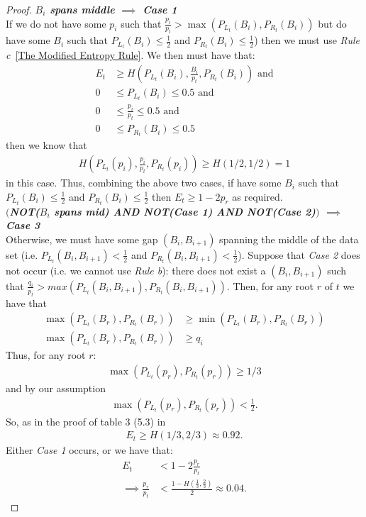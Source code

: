 \documentclass[letterpaper,12pt,titlepage,oneside,final]{book}
\theoremstyle{plain}
\begin{document}
\begin{proof}
\noindent\textbf{\textit{$B_i$ spans middle $\implies$ Case 1}} \\
If we do not have some $p_i$ such that $\frac{p_i}{p_t} > \max(P_{L_t}(B_i), P_{R_t}(B_i))$ but do have some $B_i$ such that $P_{L_t}(B_i) \leq \frac{1}{2}$ and $P_{R_t}(B_i) \leq \frac{1}{2}$) then we must use \textit{Rule c}~\ref{The Modified Entropy Rule}. We then must have that:
\begin{align*}
 E_t &\geq H(P_{L_t}(B_i), \frac{B_i}{p_t} , P_{R_t}(B_i)) \text{ and} \\
 0 &\leq P_{L_t}(B_i) \leq 0.5 \text{ and}\\
 0 &\leq \frac{p_i}{p_t} \leq 0.5 \text{ and}\\
 0 &\leq P_{R_t}(B_i) \leq 0.5
\end{align*} 
   then we know that \\
\begin{align*}
H(P_{L_t}(p_i), \frac{p_i}{p_t} , P_{R_t}(p_i)) \geq H(1/2, 1/2) = 1
\end{align*}
in this case.
 Thus, combining the above two cases, if have some $B_i$ such that $P_{L_t}(B_i) \leq \frac{1}{2}$ and $P_{R_t}(B_i) \leq \frac{1}{2}$ then $E_t \geq 1-2p_r$ as required. \\

\noindent\textbf{\textit{$\big($NOT($B_i$ spans mid) AND NOT(Case 1) AND NOT(Case 2)$\big)$ $\implies$ Case 3}} \\
Otherwise, we must have some gap $(B_i, B_{i+1})$ spanning the middle of the data set (i.e. $P_{L_t}(B_i, B_{i+1}) < \frac{1}{2}$ and $P_{R_t}(B_i, B_{i+1}) < \frac{1}{2}$). Suppose that \textit{Case 2} does not occur (i.e. we cannot use \textit{Rule b}): there does not exist a $(B_i, B_{i+1})$ such that $\frac{q_i}{p_t} > max(P_{L_t}(B_i, B_{i+1}), P_{R_t}(B_i, B_{i+1}))$. Then, for any root $r$ of $t$ we have that \\
\begin{align*}
\max(P_{L_t}(B_r), P_{R_t}(B_r)) &\geq \min(P_{L_t}(B_r), P_{R_t}(B_r))\\ 
\max(P_{L_t}(B_r), P_{R_t}(B_r)) &\geq q_i
\end{align*}
Thus, for any root $r$:
\begin{align*}
\max(P_{L_t}(p_r), P_{R_t}(p_r)) \geq 1/3
\end{align*}
 and by our assumption 
\begin{align*}
\max(P_{L_t}(p_r), P_{R_t}(p_r)) < \frac{1}{2}.
\end{align*}
 So, as in the proof of table 3 (5.3) in \cite{guttler1980binary}\\
\begin{align*}
E_t \geq H(1/3, 2/3) \approx 0.92.
\end{align*}
Either \textit{Case 1} occurs, or we have that:
\begin{align*}
E_t &< 1-2\frac{p_r}{p_t} \\
\implies \frac{p_r}{p_t} &< \frac{1-H(\frac{1}{3}, \frac{2}{3})}{2} \approx 0.04.
\end{align*}


\end{proof}
\end{document}
